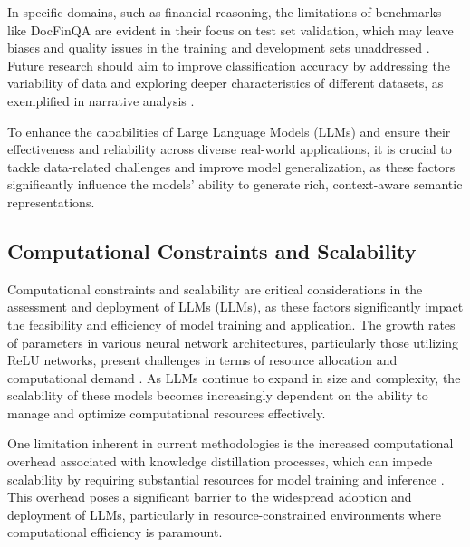 In specific domains, such as financial reasoning, the limitations of benchmarks like DocFinQA are evident in their focus on test set validation, which may leave biases and quality issues in the training and development sets unaddressed \cite{reddy2024docfinqalongcontextfinancialreasoning}. Future research should aim to improve classification accuracy by addressing the variability of data and exploring deeper characteristics of different datasets, as exemplified in narrative analysis \cite{jannidis2016analyzingfeaturesdetectionhappy}.



To enhance the capabilities of Large Language Models (LLMs) and ensure their effectiveness and reliability across diverse real-world applications, it is crucial to tackle data-related challenges and improve model generalization, as these factors significantly influence the models' ability to generate rich, context-aware semantic representations. \cite{wang2024espewrobustcopyrightprotection}



\subsection{Computational Constraints and Scalability} \label{subsec:Computational Constraints and Scalability}



Computational constraints and scalability are critical considerations in the assessment and deployment of LLMs (LLMs), as these factors significantly impact the feasibility and efficiency of model training and application. The growth rates of parameters in various neural network architectures, particularly those utilizing ReLU networks, present challenges in terms of resource allocation and computational demand \cite{morina2024growthparametersapproximatingrelu}. As LLMs continue to expand in size and complexity, the scalability of these models becomes increasingly dependent on the ability to manage and optimize computational resources effectively.



One limitation inherent in current methodologies is the increased computational overhead associated with knowledge distillation processes, which can impede scalability by requiring substantial resources for model training and inference \cite{zhao2022lifelonglearningmultilingualneural}. This overhead poses a significant barrier to the widespread adoption and deployment of LLMs, particularly in resource-constrained environments where computational efficiency is paramount.



